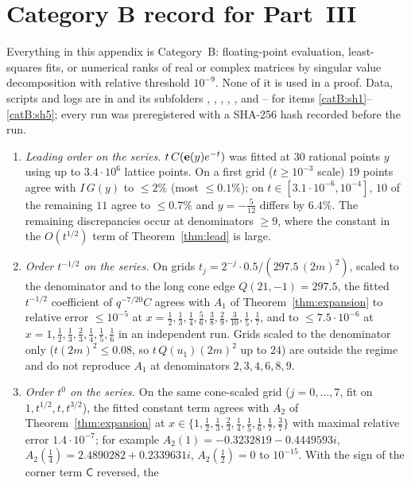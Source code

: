 \section{Category B record for Part~III}\label{app:catB}
Everything in this appendix is Category~B: floating-point evaluation, least-squares fits, or numerical ranks of real or complex matrices by singular
value decomposition with relative threshold $10^{-9}$. None of it is used in a proof. Data, scripts and logs are in  and
its subfolders , , , , , and -- for items \ref{catB:sh1}--\ref{catB:sh5}; every run was preregistered with a SHA-256 hash recorded before the run.
\begin{enumerate}[label=D.\arabic*,leftmargin=3em]
\item\label{catB:lead} \emph{Leading order on the series.} $t\,C(\mathbf{e}(y)e^{-t})$ was fitted at $30$ rational points $y$ using up to $3.4\cdot10^6$ lattice points.
On a first grid ($t\ge10^{-3}$ scale) $19$ points agree with $I\,G(y)$ to $\le2\%$ (most $\le0.1\%$); on $t\in[3.1\cdot10^{-6},10^{-4}]$, $10$ of the remaining
$11$ agree to $\le0.7\%$ and $y=-\frac5{12}$ differs by $6.4\%$. The remaining discrepancies occur at denominators $\ge9$, where the constant in the $O(t^{1/2})$
term of Theorem~\ref{thm:lead} is large.
\item\label{catB:o2} \emph{Order $t^{-1/2}$ on the series.} On grids $t_j=2^{-j}\cdot0.5/(297.5\,(2m)^2)$, scaled to the denominator and to the long cone edge
$Q(21,-1)=297.5$, the fitted $t^{-1/2}$ coefficient of $q^{-7/20}C$ agrees with $A_1$ of Theorem~\ref{thm:expansion} to relative error $\le10^{-5}$ at
$x=\frac12,\frac13,\frac14,\frac56,\frac38,\frac29,\frac3{10},\frac15,\frac17$, and to $\le7.5\cdot10^{-6}$ at $x=1,\frac12,\frac13,\frac23,\frac14,\frac15,\frac16$ in an
independent run. Grids scaled to the denominator only ($t(2m)^2\le0.08$, so $t\,Q(u_1)(2m)^2$ up to $24$) are outside the regime and do not reproduce $A_1$ at
denominators $2,3,4,6,8,9$.
\item\label{catB:o3c} \emph{Order $t^0$ on the series.} On the same cone-scaled grid ($j=0,\dots,7$, fit on $1,t^{1/2},t,t^{3/2}$), the fitted constant term agrees with
$A_2$ of Theorem~\ref{thm:expansion} at $x\in\{1,\frac12,\frac13,\frac23,\frac14,\frac15,\frac16,\frac17,\frac37\}$ with maximal relative error $1.4\cdot10^{-7}$; for example
$A_2(1)=-0.3232819-0.4449593i$, $A_2(\frac14)=2.4890282+0.2339631i$, $A_2(\frac12)=0$ to $10^{-15}$. With the sign of the corner term $\mathsf C$ reversed, the

\end{enumerate}
